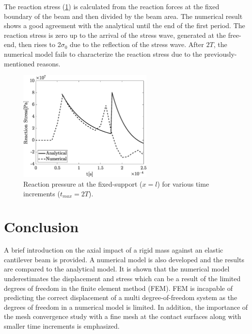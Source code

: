 \documentclass{article}
\begin{document}
The reaction stress (\cref{fig:reaction_stress}) is calculated from the reaction forces at the fixed boundary of the beam and then divided by the beam area. The numerical result shows a good agreement with the analytical until the end of the first period. The reaction stress is zero up to the arrival of the stress wave, generated at the free-end, then rises to 2$\sigma_0$ due to the reflection of the stress wave. After $2T$, the numerical model fails to characterize the reaction stress due to the previously-mentioned reasons. \\ 

\begin{figure}[H]
    \centering
    \includegraphics[width = 0.6\textwidth ]{figures/reaction_stress.eps}
    \caption{Reaction pressure at the fixed-support ($x=l$) for various time increments ($t_{max}=2T$).}
    \label{fig:reaction_stress}
\end{figure}

\section{Conclusion}
A brief introduction on the axial impact of a rigid mass against an elastic cantilever beam is provided. A numerical model is also developed and the results are compared to the analytical model. It is shown that the numerical model underestimates the displacement and stress which can be a result of the limited degrees of freedom in the finite element method (FEM). FEM is incapable of predicting the correct displacement of a multi degree-of-freedom system as the degrees of freedom in a numerical model is limited. In addition, the importance of the mesh convergence study with a fine mesh at the contact surfaces along with smaller time increments is emphasized.


\newpage


\end{document}
